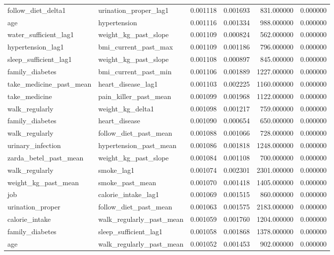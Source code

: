 \begin{longtable}{llrrrr}
follow\_diet\_delta1 & urination\_proper\_lag1 & 0.001118 & 0.001693 & 831.000000 & 0.000000 \\
age & hypertension & 0.001116 & 0.001334 & 988.000000 & 0.000000 \\
water\_sufficient\_lag1 & weight\_kg\_past\_slope & 0.001109 & 0.000824 & 562.000000 & 0.000000 \\
hypertension\_lag1 & bmi\_current\_past\_max & 0.001109 & 0.001186 & 796.000000 & 0.000000 \\
sleep\_sufficient\_lag1 & weight\_kg\_past\_slope & 0.001108 & 0.000897 & 845.000000 & 0.000000 \\
family\_diabetes & bmi\_current\_past\_min & 0.001106 & 0.001889 & 1227.000000 & 0.000000 \\
take\_medicine\_past\_mean & heart\_disease\_lag1 & 0.001103 & 0.002225 & 1160.000000 & 0.000000 \\
take\_medicine & pain\_killer\_past\_mean & 0.001099 & 0.001968 & 1122.000000 & 0.000000 \\
walk\_regularly & weight\_kg\_delta1 & 0.001098 & 0.001217 & 759.000000 & 0.000000 \\
family\_diabetes & heart\_disease & 0.001090 & 0.000654 & 650.000000 & 0.000000 \\
walk\_regularly & follow\_diet\_past\_mean & 0.001088 & 0.001066 & 728.000000 & 0.000000 \\
urinary\_infection & hypertension\_past\_mean & 0.001086 & 0.001818 & 1248.000000 & 0.000000 \\
zarda\_betel\_past\_mean & weight\_kg\_past\_slope & 0.001084 & 0.001108 & 700.000000 & 0.000000 \\
walk\_regularly & smoke\_lag1 & 0.001074 & 0.002301 & 2301.000000 & 0.000000 \\
weight\_kg\_past\_mean & smoke\_past\_mean & 0.001070 & 0.001418 & 1405.000000 & 0.000000 \\
job & calorie\_intake\_lag1 & 0.001069 & 0.001515 & 860.000000 & 0.000000 \\
urination\_proper & follow\_diet\_past\_mean & 0.001063 & 0.001575 & 2183.000000 & 0.000000 \\
calorie\_intake & walk\_regularly\_past\_mean & 0.001059 & 0.001760 & 1204.000000 & 0.000000 \\
family\_diabetes & sleep\_sufficient\_lag1 & 0.001058 & 0.001868 & 1378.000000 & 0.000000 \\
age & walk\_regularly\_past\_mean & 0.001052 & 0.001453 & 902.000000 & 0.000000 \\

\end{longtable}
